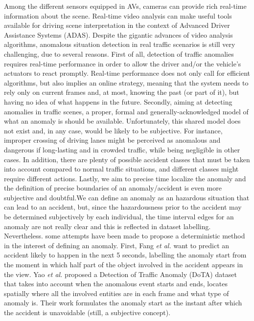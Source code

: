 Among the different sensors equipped in AVs, cameras can provide rich real-time information about the scene.
Real-time video analysis can make useful tools available for driving scene interpretation in the context of Advanced Driver Assistance Systems (ADAS).
Despite the gigantic advances of video analysis algorithms, anomalous situation detection in real traffic scenarios is still very challenging, due to several reasons.
First of all, detection of traffic anomalies requires real-time performance in order to allow the driver and/or the vehicle's actuators to react promptly.
Real-time performance does not only call for efficient algorithms, but also implies an online strategy, meaning that the system needs to rely only on current frames and, at most, knowing the past (or part of it), but having no idea of what happens in the future.
Secondly, aiming at detecting anomalies in traffic scenes, a proper, formal and generally-acknowledged model of what an anomaly is should be available.
Unfortunately, this shared model does not exist and, in any case, would be likely to be subjective.
For instance, improper crossing of driving lanes might be perceived as anomalous and dangerous if long-lasting and in crowded traffic, while being negligible in other cases.
In addition, there are plenty of possible accident classes that must be taken into account compared to normal traffic situations, and different classes might require different actions.
Lastly, we aim to precise time localize the anomaly and the definition of precise boundaries of an anomaly/accident is even more subjective and doubtful.We can define an anomaly as an hazardous situation that can lead to an accident, but, since the hazardousness prior to the accident may be determined subjectively by each individual, the time interval edges for an anomaly are not really clear and this is reflected in dataset labelling.
Nevertheless. some attempts have been made to propose a deterministic method in the interest of defining an anomaly.
First, Fang \emph{et al.} \cite{fang2019dada} want to predict an accident likely to happen in the next 5 seconds, labelling the anomaly start from the moment in which half part of the object involved in the accident appears in the view.
Yao \emph{et al.} \cite{yao2020when} proposed a Detection of Traffic Anomaly (DoTA) dataset that takes into account when the anomalous event starts and ends, locates spatially where all the involved entities are in each frame and what type of anomaly is. Their work formulates the anomaly start as the instant after which the accident is unavoidable (still, a subjective concept).

